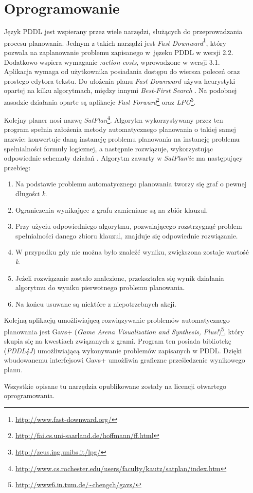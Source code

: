 \section{Oprogramowanie}
\label{sec:oprogramowanie}
Język PDDL jest wspierany przez wiele narzędzi, służących do przeprowadzania procesu planowania. Jednym z takich narządzi jest \textit{Fast Downward}\footnote{\url{http://www.fast-downward.org/}}\cite{fdalgorytm}, który pozwala na zaplanowanie problemu zapisanego w~jęzeku PDDL w wersji 2.2. Dodatkowo wspiera wymaganie \textit{:action-costs}, wprowadzone w wersji 3.1. Aplikacja wymaga od użytkownika posiadania dostępu do wiersza poleceń oraz prostego edytora tekstu. Do ułożenia planu \textit{Fast Downward} używa heurystyki opartej na kilku algorytmach, między innymi \textit{Best-First Search} \cite{fdalgorytm}. Na podobnej zasadzie działania oparte są aplikacje \textit{Fast Forward}\footnote{\url{http://fai.cs.uni-saarland.de/hoffmann/ff.html}}\cite{fastforward} oraz \textit{LPG}\footnote{\url{http://zeus.ing.unibs.it/lpg/}}\cite{lpg}.

Kolejny planer nosi nazwę \textit{SatPlan}\footnote{\url{http://www.cs.rochester.edu/users/faculty/kautz/satplan/index.htm}}\cite{satplan}. Algorytm wykorzystywany przez ten program spełnia założenia metody automatycznego planowania o takiej samej nazwie: konwertuje daną instancję problemu planowania na instancję problemu spełnialności formuły logicznej, a następnie rozwiązuje, wykorzystując odpowiednie schematy działań \cite{satplan}. Algorytm zawarty w \textit{SatPlan'ie} ma następujący przebieg: 

  \begin{enumerate}
\item Na podstawie problemu automatycznego planowania tworzy się graf o pewnej długości \textit{k}.
\item Ograniczenia wynikające z grafu zamieniane są na zbiór klauzul.
\item Przy użyciu odpowiedniego algorytmu, pozwalającego rozstrzygnąć problem spełnialności danego zbioru klauzul, znajduje się odpowiednie rozwiązanie.
\item W przypadku gdy nie można było znaleźć wyniku, zwiększona zostaje wartość \textit{k}.
\item Jeżeli rozwiązanie zostało znalezione, przekształca się wynik działania algorytmu do wyniku pierwotnego problemu planowania.
\item Na końcu usuwane są niektóre z niepotrzebnych akcji.
\end{enumerate}


Kolejną aplikacją umożliwiającą rozwiązywanie problemów automatycznego planowania jest Gavs+ (\textit{Game Arena Visualization and Synthesis, Plus!})\footnote{\url{http://www6.in.tum.de/~chengch/gavs/}}, który skupia się na kwestiach związanych z grami. Program ten posiada bibliotekę (\textit{PDDL4J}) umożliwiającą wykonywanie problemów zapisanych w PDDL. Dzięki wbudowanemu interfejsowi Gavs+ umożliwia graficzne prześledzenie wynikowego planu.

Wszystkie opisane tu narzędzia opublikowane zostały na licencji otwartego oprogramowania.

